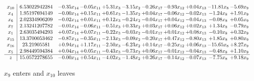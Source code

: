 \documentclass[9pt]{article}
\begin{document}
 \[\begin{array}{c| c c@{\hskip 2pt} c@{\hskip 2pt} c@{\hskip 2pt} c@{\hskip 2pt} c@{\hskip 2pt} c@{\hskip 2pt} c@{\hskip 2pt} c@{\hskip 2pt} c@{\hskip 2pt} }
 x_{10}   &  6.53022942284 & -0.35 x_{14} & -0.05 x_{11} & +  5.31 x_{3} & -3.15 x_{2} & -0.26 x_{17} & -0.93 x_{12} & +  0.04 x_{13} & -11.81 x_{8} & -5.69 x_{9}\\
 x_{4}   &  1.95197694149 & -0.00 x_{14} & +  0.15 x_{11} & +  0.61 x_{3} & -1.35 x_{2} & +  0.04 x_{17} & -0.06 x_{12} & -0.02 x_{13} & -1.24 x_{8} & +  1.91 x_{9}\\
 x_{6}   &  2.02334906209 & -0.02 x_{14} & +  0.01 x_{11} & +  0.12 x_{3} & -0.24 x_{2} & -0.04 x_{17} & +  0.04 x_{12} & -0.04 x_{13} & -0.08 x_{8} & +  0.05 x_{9}\\
 x_{7}   &  2.13241207782 & -0.01 x_{14} & -0.06 x_{11} & -0.51 x_{3} & +  0.33 x_{2} & +  0.03 x_{17} & +  0.06 x_{12} & +  0.02 x_{13} & +  1.34 x_{8} & -0.79 x_{9}\\
 x_{1}   &  2.63035494293 & +  0.07 x_{14} & +  0.07 x_{11} & -0.22 x_{3} & -0.03 x_{2} & -0.01 x_{17} & +  0.01 x_{12} & +  0.08 x_{13} & -0.10 x_{8} & +  0.32 x_{9}\\
 x_{15}   &  13.3700053462 & -0.87 x_{14} & -0.35 x_{11} & -2.13 x_{3} & -0.09 x_{2} & -0.20 x_{17} & +  0.47 x_{12} & -0.80 x_{13} & +  1.85 x_{8} & +  0.80 x_{9}\\
 x_{16}   &  23.21905581 & +  0.94 x_{14} & +  1.17 x_{11} & -2.50 x_{3} & -6.23 x_{2} & +  0.14 x_{17} & -0.25 x_{12} & +  0.06 x_{13} & -15.65 x_{8} & +  8.27 x_{9}\\
 x_{5}   &  2.98449594384 & +  0.04 x_{14} & +  0.05 x_{11} & -0.43 x_{3} & -0.73 x_{2} & +  0.06 x_{17} & -0.01 x_{12} & -0.04 x_{13} & -0.48 x_{8} & +  1.10 x_{9}\\
\hline
z    &  15.0572278655 & -0.00 x_{14} & +  0.54 x_{11} & -4.02 x_{3} & -1.48 x_{2} & +  0.26 x_{17} & -0.14 x_{12} & -0.07 x_{13} & -7.75 x_{8} & +  9.18 x_{9}\\
\end{array}\]


 $ x_{9} $ enters and $ x_{10} $ leaves 
\end{document}
